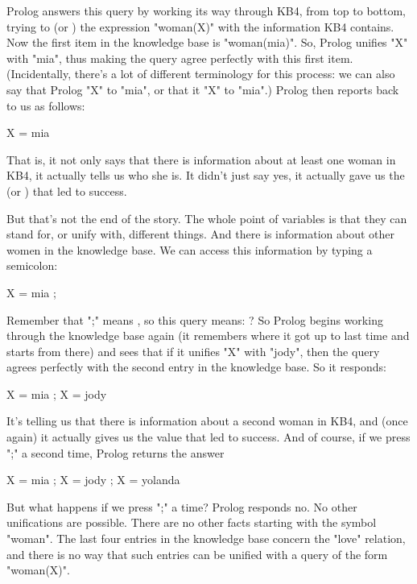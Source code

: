 \pagebreak   %
Prolog answers this query by working its way through KB4, from top to
bottom, trying to  (or ) the expression
"woman(X)" with the information KB4 contains. Now the first item in
the knowledge base is "woman(mia)". So, Prolog unifies "X" with "mia",
thus making the query agree perfectly with this first item.
(Incidentally, there's a lot of different terminology for this
process: we can also say that Prolog  "X" to
"mia", or that it  "X" to "mia".)  Prolog then reports
back to us as follows:
\begin{LPNcodedisplay}
X = mia
\end{LPNcodedisplay}
That is, it not only says that there is information about at least one
woman in KB4, it actually tells us who she is. It didn't just say yes,
it actually gave us the  (or ) that led to success.

But that's not the end of the story. The whole point of variables
is that they can stand for,  or
unify with,  different things. And there is information about other
women in the knowledge base. We can access this information by typing
a semicolon:
\begin{LPNcodedisplay}
X = mia ;
\end{LPNcodedisplay}
Remember that ";" means , so this query means:
?  So Prolog begins working through
the knowledge base again (it remembers where it got up to last time
and starts from there) and sees that if it unifies "X" with "jody",
then the query agrees perfectly with the second entry in the knowledge
base.  So it responds:
\begin{LPNcodedisplay}
X = mia ;
X = jody
\end{LPNcodedisplay}
It's telling us that there is information about a second woman in KB4,
and (once again) it actually gives us the value that led to success.
And of course, if we press ";" a second time, Prolog returns the
answer
\begin{LPNcodedisplay}
X = mia ;
X = jody ;
X = yolanda
\end{LPNcodedisplay}


But what happens if we press ";" a  time?  Prolog responds
no. No other unifications are possible.  There are no other facts starting
with the symbol "woman".  The last four entries in the knowledge base concern
the "love" relation, and there is no way that such entries can be unified with
a query of the form "woman(X)".

